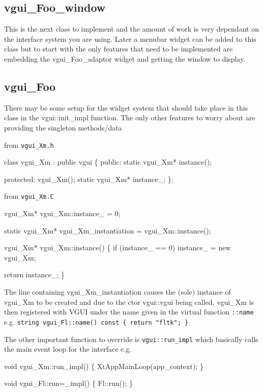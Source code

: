 \documentclass[12pt]{report} \usepackage{epsfig}
\begin{document}
\subsection{vgui\_Foo\_window}

This is the next class to implement and the amount of work is very dependant on the interface
system you are using.  Later a menubar widget can be added to this class but to start with
the only features that need to be implemented are embedding the  vgui\_Foo\_adaptor widget
and getting the window to display.

\subsection{vgui\_Foo}

There may be some setup for the widget system that should take place in this class in
the  vgui::init\_impl function.  The only other features to worry about are
providing the singleton methods/data

from {\tt vgui\_Xm.h}

{\scriptsize
\begin{verbawf}
  class vgui\_Xm : public vgui
  \{
  public:
    static vgui\_Xm* instance();

  protected:
    vgui\_Xm();
    static vgui\_Xm* instance\_;
  \};
\end{verbawf}
}

from {\tt vgui\_Xm.C}

{\scriptsize
\begin{verbawf}
  vgui\_Xm* vgui\_Xm::instance\_ = 0;

  static vgui\_Xm* vgui\_Xm\_instantiation = vgui\_Xm::instance();

  vgui\_Xm* vgui\_Xm::instance()
  \{
    if (instance\_ == 0)
      instance\_ = new vgui\_Xm;

    return instance\_;
  \}
\end{verbawf}
}

The line containing vgui\_Xm\_instantiation causes the (sole) instance of vgui\_Xm to be
created and due to the ctor  vgui::vgui being called, vgui\_Xm is then registered with
VGUI  under the name given in the virtual function {\tt ::name}
e.g.  {\tt string vgui\_Fl::name() const \{ return "fltk"; \} }

The other important function to override is {\tt vgui::run\_impl}
which basically calls the main event loop for the interface e.g.

{\scriptsize
\begin{verbawf}
  void vgui\_Xm::run\_impl()
  \{
    XtAppMainLoop(app\_context);
  \}

  void vgui\_Fl::run=\_impl()
  \{
    Fl::run();
  \}
\end{verbawf}
}
\end{document}
